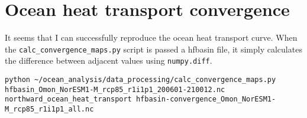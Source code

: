\section{Ocean heat transport convergence}

It seems that I can successfully reproduce the ocean heat transport curve. When the \verb!calc_convergence_maps.py! script is passed a hfbasin file, it simply calculates the difference between adjacent values using \verb!numpy.diff!.    

\begin{verbatim}
python ~/ocean_analysis/data_processing/calc_convergence_maps.py hfbasin_Omon_NorESM1-M_rcp85_r1i1p1_200601-210012.nc northward_ocean_heat_transport hfbasin-convergence_Omon_NorESM1-M_rcp85_r1i1p1_all.nc
\end{verbatim}